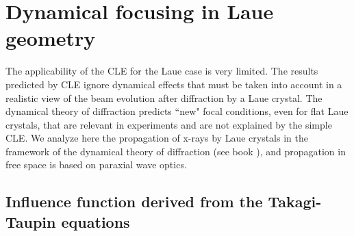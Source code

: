 \documentclass[preprint]{iucr}              %
\begin{document}
\section{Dynamical focusing in Laue geometry}
\label{sec:dynamlicalLaue}

The applicability of the CLE for the Laue case is very limited. The results predicted by CLE ignore dynamical effects that must be taken into account in a realistic view of the beam evolution after diffraction by a Laue crystal. The dynamical theory of diffraction predicts ``new" focal conditions, even for flat Laue crystals, that are relevant in experiments and are not explained by the simple CLE. We analyze here the propagation of x-rays by Laue crystals in the framework of the dynamical theory of diffraction (see book \cite{authierbook}), and propagation in free space is based on paraxial wave optics. 

\subsection{Influence function derived from the Takagi-Taupin equations}
\label{sec:influence}
\end{document}
